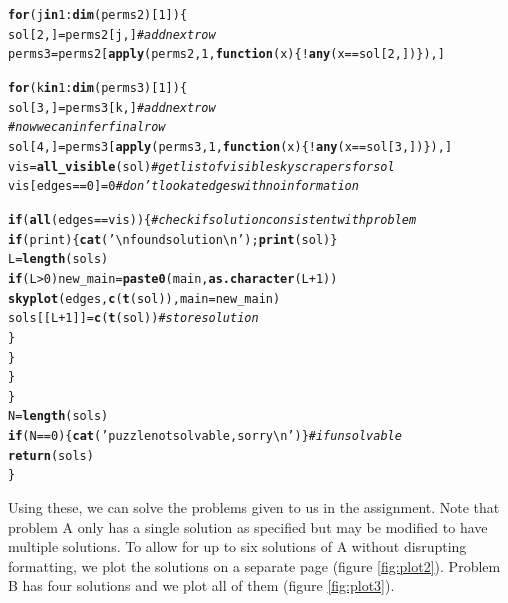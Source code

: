 \documentclass[12pt]{article}\usepackage[]{graphicx}\usepackage[]{color}
\makeatletter
\newcommand{\hlnum}[1]{\textcolor[rgb]{0.686,0.059,0.569}{#1}}%
\newcommand{\hlstr}[1]{\textcolor[rgb]{0.192,0.494,0.8}{#1}}%
\newcommand{\hlcom}[1]{\textcolor[rgb]{0.678,0.584,0.686}{\textit{#1}}}%
\newcommand{\hlopt}[1]{\textcolor[rgb]{0,0,0}{#1}}%
\newcommand{\hlstd}[1]{\textcolor[rgb]{0.345,0.345,0.345}{#1}}%
\newcommand{\hlkwa}[1]{\textcolor[rgb]{0.161,0.373,0.58}{\textbf{#1}}}%
\newcommand{\hlkwb}[1]{\textcolor[rgb]{0.69,0.353,0.396}{#1}}%
\newcommand{\hlkwc}[1]{\textcolor[rgb]{0.333,0.667,0.333}{#1}}%
\newcommand{\hlkwd}[1]{\textcolor[rgb]{0.737,0.353,0.396}{\textbf{#1}}}%
\newenvironment{kframe}{%
 \def\at@end@of@kframe{}%
 \ifinner\ifhmode%
  \def\at@end@of@kframe{\end{minipage}}%
  \begin{minipage}{\columnwidth}%
 \fi\fi%
 \def\FrameCommand##1{\hskip\@totalleftmargin \hskip-\fboxsep
 \colorbox{shadecolor}{##1}\hskip-\fboxsep
     \hskip-\linewidth \hskip-\@totalleftmargin \hskip\columnwidth}%
 \MakeFramed {\advance\hsize-\width
   \@totalleftmargin\z@ \linewidth\hsize
   \@setminipage}}%
 {\par\unskip\endMakeFramed%
 \at@end@of@kframe}
\newenvironment{knitrout}{}{} %
\makeatother
\begin{document}
\begin{knitrout}
\begin{kframe}
\begin{alltt}
    \hlkwa{for} \hlstd{(j} \hlkwa{in} \hlnum{1}\hlopt{:}\hlkwd{dim}\hlstd{(perms2)[}\hlnum{1}\hlstd{])\{}
      \hlstd{sol[}\hlnum{2}\hlstd{,]} \hlkwb{=} \hlstd{perms2[j,]} \hlcom{#add next row}
      \hlstd{perms3} \hlkwb{=} \hlstd{perms2[}\hlkwd{apply}\hlstd{(perms2,} \hlnum{1}\hlstd{,} \hlkwa{function}\hlstd{(}\hlkwc{x}\hlstd{)\{} \hlopt{!}\hlkwd{any}\hlstd{(x} \hlopt{==} \hlstd{sol[}\hlnum{2}\hlstd{,]) \}), ]}

      \hlkwa{for} \hlstd{(k} \hlkwa{in} \hlnum{1}\hlopt{:}\hlkwd{dim}\hlstd{(perms3)[}\hlnum{1}\hlstd{])\{}
        \hlstd{sol[}\hlnum{3}\hlstd{,]} \hlkwb{=} \hlstd{perms3[k,]} \hlcom{#add next row}
        \hlcom{#now we can infer final row}
        \hlstd{sol[}\hlnum{4}\hlstd{,]} \hlkwb{=} \hlstd{perms3[}\hlkwd{apply}\hlstd{(perms3,} \hlnum{1}\hlstd{,} \hlkwa{function}\hlstd{(}\hlkwc{x}\hlstd{)\{} \hlopt{!}\hlkwd{any}\hlstd{(x} \hlopt{==} \hlstd{sol[}\hlnum{3}\hlstd{,]) \}), ]}
        \hlstd{vis} \hlkwb{=} \hlkwd{all_visible}\hlstd{(sol)} \hlcom{#get list of visible skyscrapers for sol}
        \hlstd{vis[ edges} \hlopt{==} \hlnum{0} \hlstd{]}\hlkwb{=}\hlnum{0} \hlcom{#don't look at edges with no information}

        \hlkwa{if} \hlstd{(} \hlkwd{all}\hlstd{(edges} \hlopt{==} \hlstd{vis) )\{} \hlcom{#check if solution consistent with problem}
          \hlkwa{if}\hlstd{(print)\{}\hlkwd{cat}\hlstd{(}\hlstr{'\textbackslash{}nfound solution\textbackslash{}n'}\hlstd{);} \hlkwd{print}\hlstd{(sol)\}}
          \hlstd{L} \hlkwb{=} \hlkwd{length}\hlstd{(sols)}
          \hlkwa{if} \hlstd{(L}\hlopt{>}\hlnum{0}\hlstd{) new_main} \hlkwb{=} \hlkwd{paste0}\hlstd{(main,}\hlkwd{as.character}\hlstd{(L}\hlopt{+}\hlnum{1}\hlstd{))}
          \hlkwd{skyplot}\hlstd{(edges,}\hlkwd{c}\hlstd{(}\hlkwd{t}\hlstd{(sol)),}\hlkwc{main}\hlstd{=new_main)}
          \hlstd{sols[[L}\hlopt{+}\hlnum{1}\hlstd{]]} \hlkwb{=} \hlkwd{c}\hlstd{(}\hlkwd{t}\hlstd{(sol))} \hlcom{#store solution}
        \hlstd{\}}
      \hlstd{\}}
    \hlstd{\}}
  \hlstd{\}}
  \hlstd{N} \hlkwb{=} \hlkwd{length}\hlstd{(sols)}
  \hlkwa{if} \hlstd{(N} \hlopt{==} \hlnum{0}\hlstd{)\{}\hlkwd{cat}\hlstd{(}\hlstr{'puzzle not solvable, sorry\textbackslash{}n'}\hlstd{)\}} \hlcom{#if unsolvable}
  \hlkwd{return}\hlstd{(sols)}
\hlstd{\}}
\end{alltt}
\end{kframe}
\end{knitrout}

Using these, we can solve the problems given to us in the assignment. Note that problem A only has a single solution as specified but may be modified to have multiple solutions. To allow for up to six solutions of A without disrupting formatting, we plot the solutions on a separate page (figure \ref{fig:plot2}). Problem B has four solutions and we plot all of them (figure \ref{fig:plot3}). 
\end{document}
